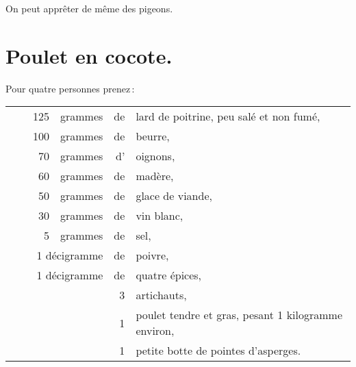 \sk

On peut apprêter de même des pigeons.

\section*{\centering Poulet en cocote.}
{}

Pour quatre personnes prenez :

\medskip

\footnotesize
\begin{longtable}{rrrrrp{18em}}
  & \hspace{2em}  & 125 & grammes & de & lard de poitrine, peu salé et non fumé,                          \\
  & & 100 & grammes & de & beurre,                                                                        \\
  & &  70 & grammes & d' & oignons,                                                                       \\
  & &  60 & grammes & de & madère,                                                                        \\
  & &  50 & grammes & de & glace de viande,                                                               \\
  & &  30 & grammes & de & vin blanc,                                                                     \\
  & &   5 & grammes & de & sel,                                                                           \\
  & \multicolumn{3}{r}{1 décigramme} & de & poivre,                                                       \\
  & \multicolumn{3}{r}{1 décigramme} & de & quatre épices,                                                \\
  & &     &         &  3 & artichauts,                                                                    \\
  & &     &         &  1 & poulet tendre et gras, pesant 1 kilogramme environ,                            \\
  & &     &         &  1 & petite botte de pointes d'asperges.                                            \\
\end{longtable}
\normalsize

